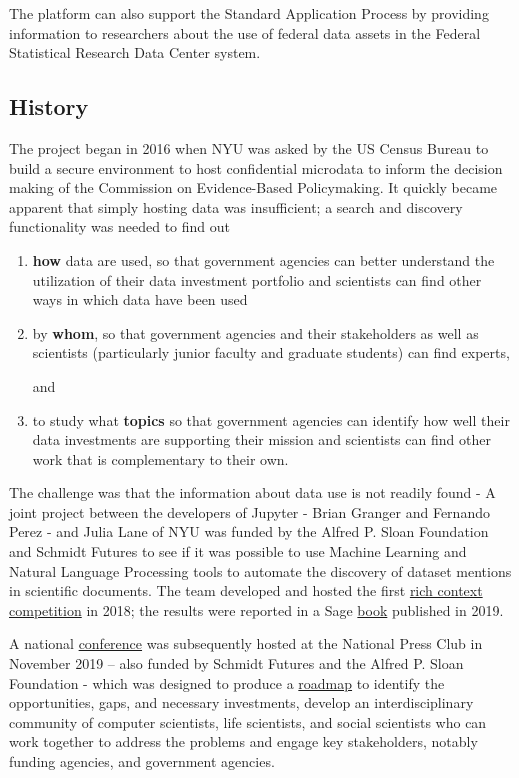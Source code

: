 \documentclass[titlepage, 11pt]{article}
\begin{document}
{The platform can also support the Standard Application Process by providing information to researchers about the use of federal data assets in the Federal Statistical Research Data Center system. 

\subsection {History}
The project began in 2016 when NYU was asked by the US Census Bureau to build a secure environment to host confidential microdata to inform the decision making of the Commission on Evidence-Based Policymaking. It quickly became apparent that simply hosting data was insufficient; a search and discovery functionality was needed to find out 
\begin{enumerate}[label=(\roman*)]
\item \textbf{how} data are used, so that government agencies can better understand the utilization of their data investment portfolio and scientists can find other ways in which data have been used 

\item by \textbf{whom}, so that government agencies and their stakeholders as well as scientists (particularly junior faculty and graduate students) can find experts,

and

\item to study what \textbf{topics} so that government agencies can identify how well their data investments are supporting their mission and scientists can find other work that is complementary to their own.
\end{enumerate}


The challenge was that the information about data use is not readily found - A joint project between the developers of Jupyter - Brian Granger and Fernando Perez - and Julia Lane of NYU was funded by the Alfred P. Sloan Foundation and Schmidt Futures to see if it was possible to use Machine Learning and Natural Language Processing tools to automate the discovery of dataset mentions in scientific documents.  The team developed and hosted the first \href{https://coleridgeinitiative.org/richcontextcompetition}{rich context competition} in 2018; the results were reported in a Sage \href{https://study.sagepub.com/richcontext}{book} published in 2019\cite{source1}. 

A national \href{https://coleridgeinitiative.org/richcontext/richcontextworkshop/}{conference} was subsequently hosted at the National Press Club in November 2019 – also funded by Schmidt Futures and the Alfred P. Sloan Foundation - which was designed to produce a \href{https://coleridgeinitiative.org/wp-content/uploads/2022/01/WorkshopReport_November-25_final_Jan-6_2020.pdf}{roadmap} to identify the opportunities, gaps, and necessary investments, develop an interdisciplinary community of computer scientists, life scientists, and social scientists who can work together to address the problems and engage key stakeholders, notably funding agencies, and government agencies.


}
\end{document}
